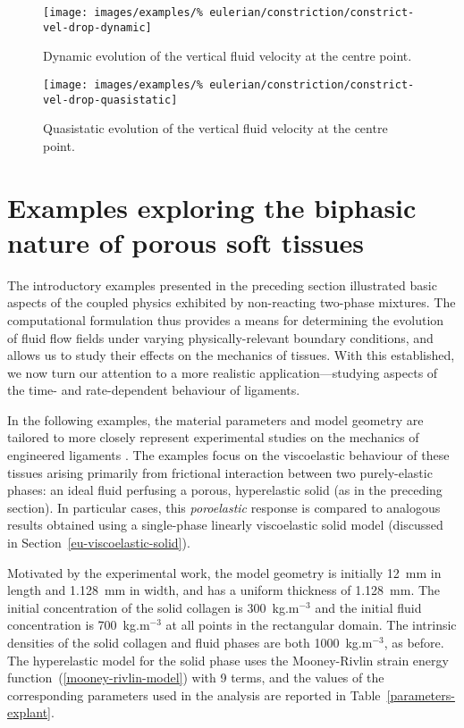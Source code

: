 \begin{figure}[!hptb]
  \centering
  \texttt{[image: images/examples/\%
    eulerian/constriction/constrict-vel-drop-dynamic]}
  \caption{Dynamic evolution of the vertical fluid velocity at the
    centre point.}
  \label{velocity-evolution-dynamic}
\end{figure}

\begin{figure}[!hptb]
  \centering
  \texttt{[image: images/examples/\%
    eulerian/constriction/constrict-vel-drop-quasistatic]}
  \caption{Quasistatic evolution of the vertical fluid velocity at the
    centre point.}
  \label{velocity-evolution-quasistatic}
\end{figure}

\clearpage

\section{Examples exploring the biphasic nature of porous soft
  tissues}
\label{biphasic-examples-2}

The introductory examples presented in the preceding section
illustrated basic aspects of the coupled physics exhibited by
non-reacting two-phase mixtures. The computational formulation thus
provides a means for determining the evolution of fluid flow fields
under varying physically-relevant boundary conditions, and allows us
to study their effects on the mechanics of tissues. With this
established, we now turn our attention to a more realistic
application---studying aspects of the time- and rate-dependent
behaviour of ligaments.

In the following examples, the material parameters and model geometry
are tailored to more closely represent experimental studies on the
mechanics of engineered ligaments \citep{Syed-Picard:06}. The examples
focus on the viscoelastic behaviour of these tissues arising primarily
from frictional interaction between two purely-elastic phases: an
ideal fluid perfusing a porous, hyperelastic solid (as in the
preceding section). In particular cases, this {\em poroelastic}
response is compared to analogous results obtained using a
single-phase linearly viscoelastic solid model (discussed in
Section~\ref{eu-viscoelastic-solid}).

Motivated by the experimental work, the model geometry is initially
12~mm in length and 1.128~mm in width, and has a uniform thickness of
1.128~mm. The initial concentration of the solid collagen is
300~kg.m$^{-3}$ and the initial fluid concentration is 700~kg.m$^{-3}$
at all points in the rectangular domain. The intrinsic densities of
the solid collagen and fluid phases are both 1000~kg.m$^{-3}$, as
before. The hyperelastic model for the solid phase uses the
Mooney-Rivlin strain energy function~(\ref{mooney-rivlin-model}) with
9 terms, and the values of the corresponding parameters used in the
analysis are reported in Table~\ref{parameters-explant}.

